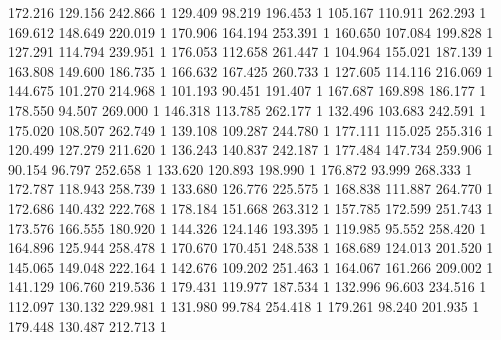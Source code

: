 	172.216	129.156	242.866	1
	129.409	98.219	196.453	1
	105.167	110.911	262.293	1
	169.612	148.649	220.019	1
	170.906	164.194	253.391	1
	160.650	107.084	199.828	1
	127.291	114.794	239.951	1
	176.053	112.658	261.447	1
	104.964	155.021	187.139	1
	163.808	149.600	186.735	1
	166.632	167.425	260.733	1
	127.605	114.116	216.069	1
	144.675	101.270	214.968	1
	101.193	90.451	191.407	1
	167.687	169.898	186.177	1
	178.550	94.507	269.000	1
	146.318	113.785	262.177	1
	132.496	103.683	242.591	1
	175.020	108.507	262.749	1
	139.108	109.287	244.780	1
	177.111	115.025	255.316	1
	120.499	127.279	211.620	1
	136.243	140.837	242.187	1
	177.484	147.734	259.906	1
	90.154	96.797	252.658	1
	133.620	120.893	198.990	1
	176.872	93.999	268.333	1
	172.787	118.943	258.739	1
	133.680	126.776	225.575	1
	168.838	111.887	264.770	1
	172.686	140.432	222.768	1
	178.184	151.668	263.312	1
	157.785	172.599	251.743	1
	173.576	166.555	180.920	1
	144.326	124.146	193.395	1
	119.985	95.552	258.420	1
	164.896	125.944	258.478	1
	170.670	170.451	248.538	1
	168.689	124.013	201.520	1
	145.065	149.048	222.164	1
	142.676	109.202	251.463	1
	164.067	161.266	209.002	1
	141.129	106.760	219.536	1
	179.431	119.977	187.534	1
	132.996	96.603	234.516	1
	112.097	130.132	229.981	1
	131.980	99.784	254.418	1
	179.261	98.240	201.935	1
	179.448	130.487	212.713	1
